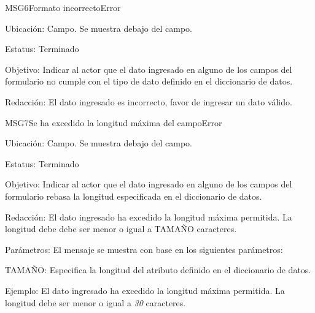 \begin{mensaje}{MSG6}{Formato incorrecto}{Error}
    \item[Ubicación:] Campo. Se muestra debajo del campo.
    \item[Estatus:] Terminado
    \item[Objetivo:] Indicar al actor que el dato ingresado en alguno de los campos del formulario no cumple con el tipo de dato definido en el diccionario de datos.
    \item[Redacción:] El dato ingresado es incorrecto, favor de ingresar un dato válido.
\end{mensaje}

\begin{mensaje}{MSG7}{Se ha excedido la longitud máxima del campo}{Error}
    \item[Ubicación:] Campo. Se muestra debajo del campo.
    \item[Estatus:] Terminado
    \item[Objetivo:] Indicar al actor que el dato ingresado en alguno de los campos del formulario rebasa la longitud especificada en el diccionario de datos.
    \item[Redacción:] El dato ingresado ha excedido la longitud máxima permitida. La longitud debe debe ser menor o igual a TAMAÑO caracteres.  
    \item[Parámetros:] El mensaje se muestra con base en los siguientes parámetros:
    \begin{Citemize}
	\item TAMAÑO: Especifica la longitud del atributo definido en el diccionario de datos.
    \end{Citemize}
    \item[Ejemplo:] El dato ingresado ha excedido la longitud máxima permitida. La longitud debe ser menor o igual a {\em 30} caracteres.
\end{mensaje}


